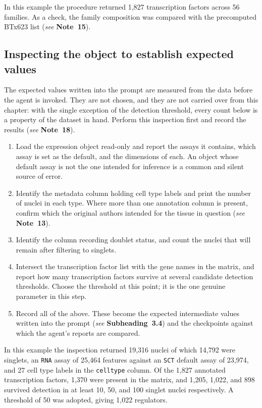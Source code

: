 \documentclass[11pt,a4paper]{article}
\newcommand{\seenote}[1]{(\textit{see} \textbf{Note~#1})}
\newcommand{\seesub}[1]{(\textit{see} \textbf{Subheading~#1})}
\begin{document}
In this example the procedure returned 1,827 transcription factors across 56 families. As a check, the family composition was compared with the precomputed BTx623 list \seenote{15}.

\subsection{Inspecting the object to establish expected values}

The expected values written into the prompt are measured from the data before the agent is invoked. They are not chosen, and they are not carried over from this chapter: with the single exception of the detection threshold, every count below is a property of the dataset in hand. Perform this inspection first and record the results \seenote{18}.

\begin{enumerate}[leftmargin=*]
\item Load the expression object read-only and report the assays it contains, which assay is set as the default, and the dimensions of each. An object whose default assay is not the one intended for inference is a common and silent source of error.

\item Identify the metadata column holding cell type labels and print the number of nuclei in each type. Where more than one annotation column is present, confirm which the original authors intended for the tissue in question \seenote{13}.

\item Identify the column recording doublet status, and count the nuclei that will remain after filtering to singlets.

\item Intersect the transcription factor list with the gene names in the matrix, and report how many transcription factors survive at several candidate detection thresholds. Choose the threshold at this point; it is the one genuine parameter in this step.

\item Record all of the above. These become the expected intermediate values written into the prompt \seesub{3.4} and the checkpoints against which the agent's reports are compared.
\end{enumerate}

In this example the inspection returned 19,316 nuclei of which 14,792 were singlets, an \texttt{RNA} assay of 25,464 features against an \texttt{SCT} default assay of 23,974, and 27 cell type labels in the \texttt{celltype} column. Of the 1,827 annotated transcription factors, 1,370 were present in the matrix, and 1,205, 1,022, and 898 survived detection in at least 10, 50, and 100 singlet nuclei respectively. A threshold of 50 was adopted, giving 1,022 regulators.
\end{document}
